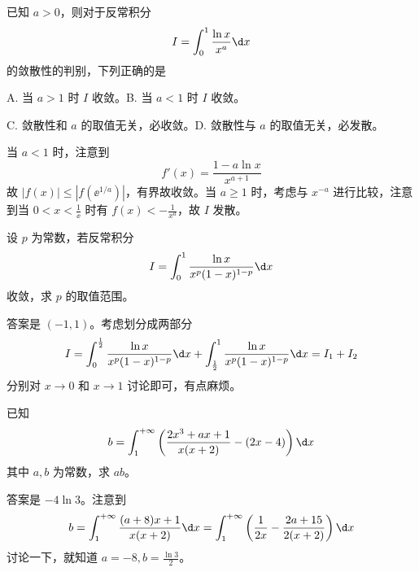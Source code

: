 \begin{problem}[000027]
已知 $a > 0$，则对于反常积分
\[ I = \int_{0}^{1} \frac{\ln x}{x^a} \d x \]
的敛散性的判别，下列正确的是

A. 当 $a > 1$ 时 $I$ 收敛。B. 当 $a < 1$ 时 $I$ 收敛。

C. 敛散性和 $a$ 的取值无关，必收敛。D. 敛散性与 $a$ 的取值无关，必发散。
\end{problem}
\begin{solution}
	当 $a < 1$ 时，注意到
	\[ f'(x) = \frac{1 - a \ln x}{x^{a+1}} \]
	故 $|f(x)| \leqslant |f(\ee^{1/a})|$，有界故收敛。当 $a \geqslant 1$ 时，考虑与 $x^{-a}$ 进行比较，注意到当 $0 < x < \frac{1}{\ee}$ 时有 $f(x) < -\frac{1}{x^a}$，故 $I$ 发散。
\end{solution}

\begin{problem}[000028]
设 $p$ 为常数，若反常积分
\[ I = \int_{0}^{1} \frac{\ln x}{x^p(1-x)^{1-p}} \d x \]
收敛，求 $p$ 的取值范围。
\end{problem}
\begin{solution}
	答案是 $(-1,1)$。考虑划分成两部分
	\[ I = \int_{0}^{\frac{1}{2}} \frac{\ln x}{x^p(1-x)^{1-p}} \d x + \int_{\frac{1}{2}}^{1} \frac{\ln x}{x^p(1-x)^{1-p}} \d x = I_1 + I_2 \]
	分别对 $x \to 0$ 和 $x \to 1$ 讨论即可，有点麻烦。
\end{solution}

\begin{problem}[000029]
已知
\[ b = \int_{1}^{+\infty} \left(\frac{2x^3 + ax + 1}{x(x+2)} - (2x-4)\right) \d x \]
其中 $a,b$ 为常数，求 $ab$。
\end{problem}
\begin{solution}
	答案是 $-4 \ln 3$。注意到
	\[ b = \int_{1}^{+\infty} \frac{(a+8)x+1}{x(x+2)} \d x= \int_{1}^{+\infty} \left(\frac{1}{2x} - \frac{2a+15}{2(x+2)}\right) \d x \]
	讨论一下，就知道 $a = -8, b = \frac{\ln 3}{2} $。
\end{solution}

